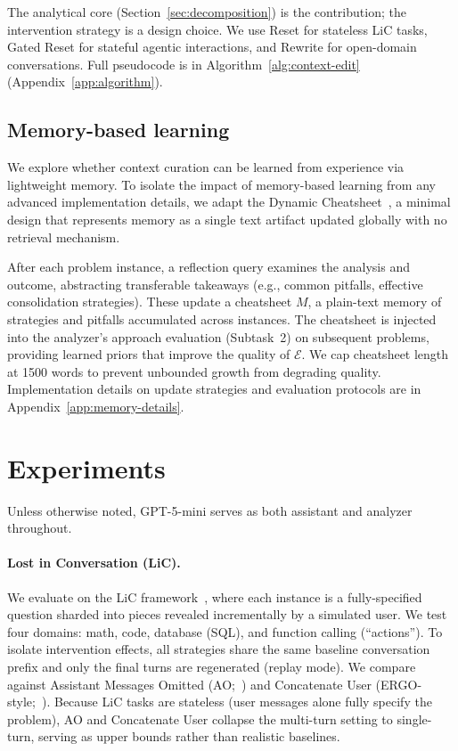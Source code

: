 \documentclass{article} %
\begin{document}
The analytical core (Section~\ref{sec:decomposition}) is the contribution; the intervention strategy is a design choice. We use Reset for stateless LiC tasks, Gated Reset for stateful agentic interactions, and Rewrite for open-domain conversations. Full pseudocode is in Algorithm~\ref{alg:context-edit} (Appendix~\ref{app:algorithm}).

\subsection{Memory-based learning}
\label{sec:memory}

We explore whether context curation can be learned from experience via lightweight memory. 
To isolate the impact of memory-based learning from any advanced implementation details, we adapt the Dynamic Cheatsheet~\citep{suzgun2025cheatsheet}, a minimal design that represents memory as a single text artifact updated globally with no retrieval mechanism.

After each problem instance, a reflection query examines the analysis and outcome, abstracting transferable takeaways (e.g., common pitfalls, effective consolidation strategies). These update a cheatsheet $M$, a plain-text memory of strategies and pitfalls accumulated across instances. The cheatsheet is injected into the analyzer's approach evaluation (Subtask~2) on subsequent problems, providing learned priors that improve the quality of $\mathcal{E}$. We cap cheatsheet length at 1500 words to prevent unbounded growth from degrading quality. Implementation details on update strategies and evaluation protocols are in Appendix~\ref{app:memory-details}.


\section{Experiments}
\label{sec:experiments}

Unless otherwise noted, GPT-5-mini serves as both assistant and analyzer throughout.

\paragraph{Lost in Conversation (LiC).}
We evaluate on the LiC framework~\citep{laban2025lost}, where each instance is a fully-specified question sharded into pieces revealed incrementally by a simulated user. We test four domains: math, code, database (SQL), and function calling (``actions''). To isolate intervention effects, all strategies share the same baseline conversation prefix and only the final turns are regenerated (replay mode). We compare against Assistant Messages Omitted (AO;~\citealt{huang2026context}) and Concatenate User (ERGO-style;~\citealt{khalid2025ergo}). Because LiC tasks are stateless (user messages alone fully specify the problem), AO and Concatenate User collapse the multi-turn setting to single-turn, serving as upper bounds rather than realistic baselines.
\end{document}
